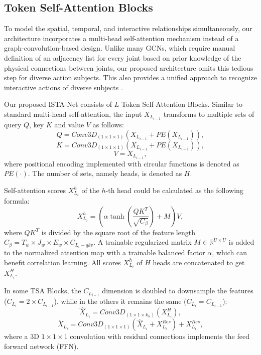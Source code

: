 \documentclass[letterpaper, 10 pt, conference]{ieeeconf}
\begin{document}
\subsection{Token Self-Attention Blocks}
To model the spatial, temporal, and interactive relationships simultaneously, our architecture incorporates a multi-head self-attention mechanism instead of a graph-convolution-based design. Unlike many GCNs, which require manual definition of an adjacency list for every joint based on prior knowledge of the physical connections between joints, our proposed architecture omits this tedious step for diverse action subjects. This also provides a unified approach to recognize interactive actions of diverse subjects .

Our proposed ISTA-Net consists of $L$ Token Self-Attention Blocks. Similar to standard multi-head self-attention, the input $X_{L_{i-1}}$ transforms to multiple sets of query $Q$, key $K$ and value $V$ as follows:  
\begin{equation}
    Q = Conv3D_{(1\times 1 \times 1)}(X_{L_{i-1}}+PE(X_{L_{i-1}})),
\end{equation}
\begin{equation}
    K = Conv3D_{(1\times 1 \times 1)}(X_{L_{i-1}}+PE(X_{L_{i-1}})),
\end{equation}
\begin{equation}
    V = X_{L_{i-1}},
\end{equation}
where positional encoding implemented with circular functions is denoted as $PE(\cdot)$. The number of sets, namely heads, is denoted as $H$.

Self-attention scores $X^{h}_{L_i}$ of the $h$-th head could be calculated as the following formula:
\begin{equation}
    X^{h}_{L_i} = (\alpha \tanh{(\frac{QK^{T}}{\sqrt{C_{\beta}}})} + M)V,
\end{equation}
where $QK^{T}$ is divided by the square root of the feature length $C_{\beta}=T_{w}\times J_{w} \times E_{w} \times C_{L_{i}-qkv}$. A trainable regularized matrix $M \in \mathbb{R}^{U\times U}$ is added to the normalized attention map with a trainable balanced factor $\alpha$, which can benefit correlation learning\cite{dstanet2020,STSA-Net2023}. All scores $X^{h}_{L_i}$ of $H$ heads are concatenated to get $X^{H}_{L_i}$. 

In some TSA Blocks, the $C_{L_{i-1}}$ dimension is doubled to downsample the features ($C_{L_{i}}=2\times C_{L_{i-1}}$), while in the others it remains the same ($C_{L_{i}}=C_{L_{i-1}}$):
\begin{equation}
    \hat{X}_{L_i} = Conv3D_{(1\times 1 \times k_u)}(X^{H}_{L_i}),
\end{equation}
\begin{equation}
    \acute{X}_{L_i} = Conv3D_{(1\times 1 \times 1)}(\hat{X}_{L_i}+X^{Res}_{L_{i}}) + X^{Res}_{L_{i}},
\end{equation}
where a 3D $1\times 1 \times 1$ convolution with residual connections implements the feed forward network (FFN).
\end{document}
